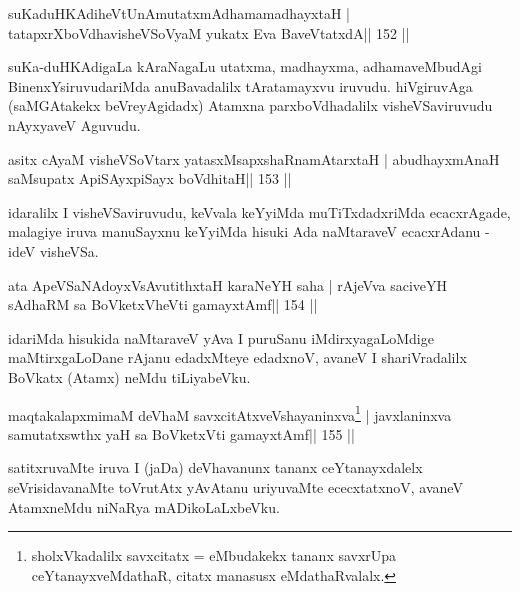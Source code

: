 
\begin{shl}
suKaduHKAdiheVtUnAmutatxmAdhamamadhayxtaH |
tatapxrXboVdhavisheVSoV\s yaM yukatx Eva BaveVtatxdA\hfill || 152 ||
\end{shl}

\begin{artha}
suKa-duHKAdigaLa kAraNagaLu utatxma, madhayxma, adhamaveMbudAgi 
BinenxYsiruvudariMda anuBavadalilx tAratamayxvu iruvudu. hiVgiruvAga (saMGAtakekx beVreyAgidadx) Atamxna parxboVdhadalilx visheVSaviruvudu nAyxyaveV Aguvudu.
\end{artha}


\begin{shl}
asitx cAyaM visheVSoV\s tarx yatasxMsapxshaRnamAtarxtaH |
abudhayxmAnaH saMsupatx ApiSAyx\s\s piSayx boVdhitaH\hfill || 153 ||
\end{shl}

\begin{artha}
idaralilx I visheVSaviruvudu, keVvala keYyiMda muTiTxdadxriMda ecacxrAgade, malagiye iruva manuSayxnu keYyiMda hisuki Ada naMtaraveV ecacxrAdanu - ideV visheVSa.
\end{artha}

\begin{shl}
ata ApeVSaNAdoyxV\s sAvutithxtaH karaNeYH saha |
rAjeVva saciveYH sAdhaRM sa BoVketxVheVti gamayxtAmf\hfill || 154 ||
\end{shl}

\begin{artha}
idariMda hisukida naMtaraveV yAva I puruSanu iMdirxyagaLoMdige maMtirxgaLoDane rAjanu edadxMteye edadxnoV, avaneV I shariVradalilx BoVkatx (Atamx) neMdu tiLiyabeVku.
\end{artha}


\begin{shl}
maqtakalapxmimaM deVhaM savxcitAtxveVshayaninxva\footnote{sholxVkadalilx savxcitatx = eMbudakekx tananx savxrUpa ceYtanayxveMdathaR, citatx manasusx eMdathaRvalalx.} |
javxlaninxva samutatxswthx yaH sa BoVketxVti gamayxtAmf\hfill || 155 ||
\end{shl}

\begin{artha}
satitxruvaMte iruva I (jaDa) deVhavanunx tananx ceYtanayxdalelx  seVrisidavanaMte toVrutAtx yAvAtanu uriyuvaMte ececxtatxnoV, avaneV AtamxneMdu niNaRya mADikoLaLxbeVku.
\end{artha}

